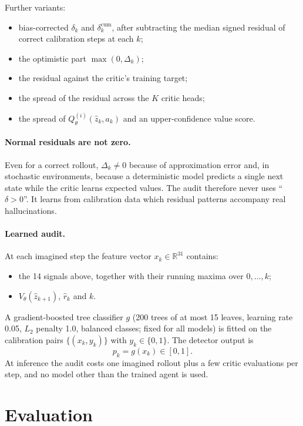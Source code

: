 \documentclass[11pt]{article}
\newcommand{\R}{\mathbb{R}}
\begin{document}
Further variants:
\begin{itemize}[nosep]
\item bias-corrected $\delta_k$ and $\delta^{\text{cum}}_k$, after subtracting the median signed residual of correct
  calibration steps at each $k$;
\item the optimistic part $\max(0,\Delta_k)$;
\item the residual against the critic's training target;
\item the spread of the residual across the $K$ critic heads;
\item the spread of $Q^{(i)}_\theta(\hat z_k,a_k)$ and an upper-confidence value score.
\end{itemize}

\paragraph{Normal residuals are not zero.}
Even for a correct rollout, $\Delta_k\neq0$ because of approximation error and, in stochastic environments, because a
deterministic model predicts a single next state while the critic learns expected values. The audit therefore never
uses ``$\delta>0$''. It learns from calibration data which residual patterns accompany real hallucinations.

\paragraph{Learned audit.}
At each imagined step the feature vector $x_k\in\R^{31}$ contains:
\begin{itemize}[nosep]
\item the 14 signals above, together with their running maxima over $0,\dots,k$;
\item $V_\theta(\hat z_{k+1})$, $\hat r_k$ and $k$.
\end{itemize}
A gradient-boosted tree classifier $g$ (200 trees of at most 15 leaves, learning rate 0.05, $L_2$ penalty 1.0,
balanced classes; fixed for all models) is fitted on the calibration pairs $\{(x_k,y_k)\}$ with $y_k\in\{0,1\}$.
The detector output is
\[
p_k=g(x_k)\in[0,1].
\]
At inference the audit costs one imagined rollout plus a few critic evaluations per step, and no model other than
the trained agent is used.

\section{Evaluation}
\end{document}
